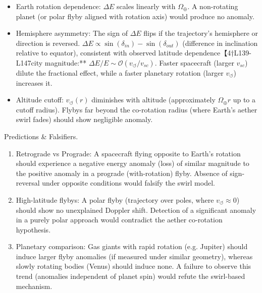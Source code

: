 \documentclass[11pt]{article}
\begin{document}
\begin{itemize}
\item 
Earth rotation dependence: $\Delta E$ scales linearly with $\Omega_{\oplus}$. A non-rotating planet (or polar flyby aligned with rotation axis) would produce no anomaly.




\item 
Hemisphere asymmetry: The sign of $\Delta E$ flips if the trajectory’s hemisphere or direction is reversed. $\Delta E \propto \sin(\delta_{in}) - \sin(\delta_{out})$ (difference in inclination relative to equator), consistent with observed latitude dependence【4†L139-L147city magnitude:** $\Delta E/E \sim \mathcal{O}(v_{\circlearrowleft}/v_{sc})$. Faster spacecraft (larger $v_{sc}$) dilute the fractional effect, while a faster planetary rotation (larger $v_{\circlearrowleft}$) increases it.




\item 
Altitude cutoff: $v_{\circlearrowleft}(r)$ diminishes with altitude (approximately $\Omega_{\oplus} r$ up to a cutoff radius). Flybys far beyond the co-rotation radius (where Earth’s aether swirl fades) should show negligible anomaly.




\end{itemize}

Predictions & Falsifiers.


\begin{enumerate}

\item 
Retrograde vs Prograde: A spacecraft flying opposite to Earth’s rotation should experience a negative energy anomaly (loss) of similar magnitude to the positive anomaly in a prograde (with-rotation) flyby. Absence of sign-reversal under opposite conditions would falsify the swirl model.




\item 
High-latitude flybys: A polar flyby (trajectory over poles, where $v_{\circlearrowleft}\approx0$) should show no unexplained Doppler shift. Detection of a significant anomaly in a purely polar approach would contradict the aether co-rotation hypothesis.




\item 
Planetary comparison: Gas giants with rapid rotation (e.g. Jupiter) should induce larger flyby anomalies (if measured under similar geometry), whereas slowly rotating bodies (Venus) should induce none. A failure to observe this trend (anomalies independent of planet spin) would refute the swirl-based mechanism.




\end{enumerate}
\end{document}
